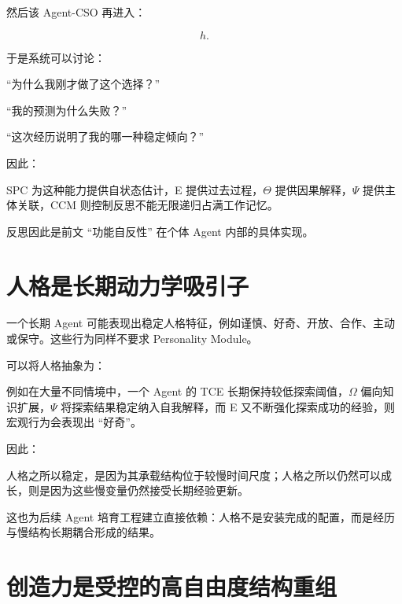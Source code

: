 然后该 Agent-CSO 再进入：

\[
h.
\]

于是系统可以讨论：

``为什么我刚才做了这个选择？''

``我的预测为什么失败？''

``这次经历说明了我的哪一种稳定倾向？''

因此：

\begin{statementbox}
\centering
{}
\end{statementbox}

SPC 为这种能力提供自状态估计，E 提供过去过程，$\Theta$ 提供因果解释，$\Psi$ 提供主体关联，CCM 则控制反思不能无限递归占满工作记忆。

反思因此是前文 ``功能自反性'' 在个体 Agent 内部的具体实现。

\section{人格是长期动力学吸引子}

一个长期 Agent 可能表现出稳定人格特征，例如谨慎、好奇、开放、合作、主动或保守。这些行为同样不要求 Personality Module。

可以将人格抽象为：

\begin{statementbox}
\centering
{}
\end{statementbox}

例如在大量不同情境中，一个 Agent 的 TCE 长期保持较低探索阈值，$\Omega$ 偏向知识扩展，$\Psi$ 将探索结果稳定纳入自我解释，而 E 又不断强化探索成功的经验，则宏观行为会表现出 ``好奇''。

因此：

\begin{statementbox}
\centering
{}
\end{statementbox}

人格之所以稳定，是因为其承载结构位于较慢时间尺度；人格之所以仍然可以成长，则是因为这些慢变量仍然接受长期经验更新。

这也为后续 Agent 培育工程建立直接依赖：人格不是安装完成的配置，而是经历与慢结构长期耦合形成的结果。

\section{创造力是受控的高自由度结构重组}


